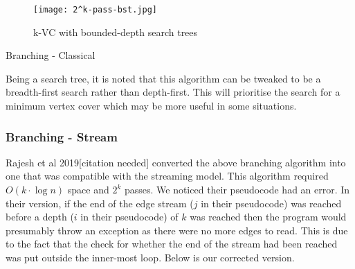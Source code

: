 \begin{figure}[h]
    \centering
    \texttt{[image: 2^k-pass-bst.jpg]}
    \caption{k-VC with bounded-depth search trees}
\end{figure}

\begin{algorithm}[H]
    \caption{Branching - Classical}
    \DontPrintSemicolon


\end{algorithm}

Being a search tree, it is noted that this algorithm can be tweaked to
be a breadth-first search rather than depth-first. This will prioritise
the search for a minimum vertex cover which may be more useful in some
situations.

\subsubsection{Branching - Stream}

Rajesh et al 2019{[}citation needed{]} converted the above branching
algorithm into one that was compatible with the streaming model. This
algorithm required \(O(k\cdot \log n)\) space and \(2^k\) passes. We
noticed their pseudocode had an error. In their version, if the end of
the edge stream (\(j\) in their pseudocode) was reached before a depth
(\(i\) in their pseudocode) of \(k\) was reached then the program would
presumably throw an exception as there were no more edges to read. This
is due to the fact that the check for whether the end of the stream had
been reached was put outside the inner-most loop. Below is our corrected
version.

